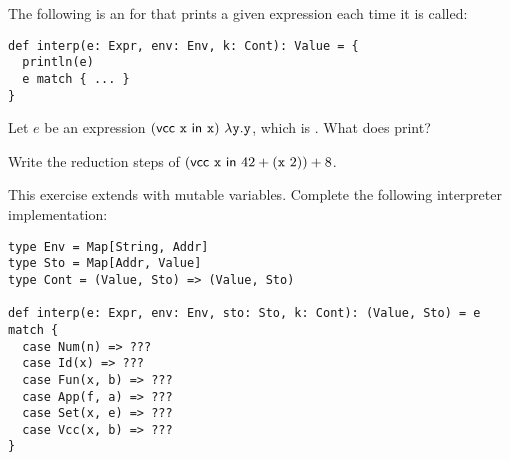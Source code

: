 \begin{exercise}

The following is an  for \Lang that prints a given
expression each time it is called:

\begin{verbatim}
def interp(e: Expr, env: Env, k: Cont): Value = {
  println(e)
  e match { ... }
}
\end{verbatim}

Let $e$ be an expression $(\textsf{vcc}\ \texttt{x}\ \textsf{in}\ \texttt{x})\ \lambda\texttt{y}.\texttt{y}$, which is
. What does  print?

\end{exercise}

\begin{exercise}

Write the reduction steps of $(\textsf{vcc}\ \texttt{x}\ \textsf{in}\ 42+(\texttt{x}\ 2))+8$.

\end{exercise}

\begin{exercise}

This exercise extends \Lang with mutable variables.
Complete the following interpreter implementation:

\begin{verbatim}
type Env = Map[String, Addr]
type Sto = Map[Addr, Value]
type Cont = (Value, Sto) => (Value, Sto)

def interp(e: Expr, env: Env, sto: Sto, k: Cont): (Value, Sto) = e match {
  case Num(n) => ???
  case Id(x) => ???
  case Fun(x, b) => ???
  case App(f, a) => ???
  case Set(x, e) => ???
  case Vcc(x, b) => ???
}
\end{verbatim}

\end{exercise}
